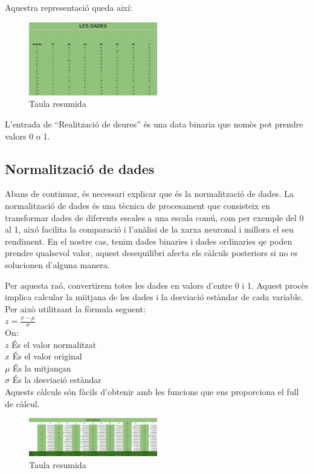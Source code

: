 Aquestra representació queda així:

\begin{figure}[H]
    \centering
    \includegraphics[width=0.5\textwidth]{./figures/Dades_resumides.png}
    \caption{Taula resumida}
\end{figure}

L'entrada de ``Realització de deures'' és una data binaria que nomès pot prendre valors 0 o 1.
\subsection{Normalització de dades}
Abans de continuar, és necessari explicar que és la normalització de dades.
La normalització de dades és una tècnica de procesament que consisteix en transformar dades de diferents escales a una escala comú, com per exemple del 0 al 1, aixó facilita la comparació i l'anàlisi de la xarxa neuronal i millora el seu rendiment. En el nostre cas, tenim dades binaries i dades ordinaries qe poden prendre qualsevol valor, aquest desequilibri afecta els càlculs posteriors si no es solucionen d'alguna manera.

Per aquesta raó, convertirem totes les dades en valors d'entre 0 i 1. Aquest procès implica calcular la miitjana de les dades i la desviació estàndar de cada variable. Per això utilitzant la fòrmula seguent:\\
$z = \frac{x - \mu}{\sigma}$\\

On:\\
$z$ És el valor normalitzat\\
$x$ És el valor original\\
$\mu$ És la mitjançan\\
$\sigma$ És la desviació estàndar\\

Aquests càlculs són fàcils d'obtenir amb les funcions que ens proporciona el full de càlcul.

\begin{figure}[H]
    \centering
    \includegraphics[width=0.5\textwidth]{./figures/Dades_normalitzades.png}
    \caption{Taula resumida}
\end{figure}

